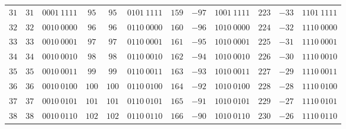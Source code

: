 \begin{center}
\begin{minipage}{0.5\linewidth}
\begin{center}
\begin{tabular}{|c|c|c||c|c|c||c|c|c||c|c|c|}
            \textcolor{numColor}{$31$} & \textcolor{twoColor}{$31$} & $0001~1111$ & \textcolor{numColor}{$95$} & \textcolor{twoColor}{$95$} & $0101~1111$ & \textcolor{numColor}{$159$} & \textcolor{twoColor}{$-97$} & $1001~1111$ & \textcolor{numColor}{$223$} & \textcolor{twoColor}{$-33$} & $1101~1111$\\ 
            \textcolor{numColor}{$32$} & \textcolor{twoColor}{$32$} & $0010~0000$ & \textcolor{numColor}{$96$} & \textcolor{twoColor}{$96$} & $0110~0000$ & \textcolor{numColor}{$160$} & \textcolor{twoColor}{$-96$} & $1010~0000$ & \textcolor{numColor}{$224$} & \textcolor{twoColor}{$-32$} & $1110~0000$\\ 
            \textcolor{numColor}{$33$} & \textcolor{twoColor}{$33$} & $0010~0001$ & \textcolor{numColor}{$97$} & \textcolor{twoColor}{$97$} & $0110~0001$ & \textcolor{numColor}{$161$} & \textcolor{twoColor}{$-95$} & $1010~0001$ & \textcolor{numColor}{$225$} & \textcolor{twoColor}{$-31$} & $1110~0001$\\ 
            \textcolor{numColor}{$34$} & \textcolor{twoColor}{$34$} & $0010~0010$ & \textcolor{numColor}{$98$} & \textcolor{twoColor}{$98$} & $0110~0010$ & \textcolor{numColor}{$162$} & \textcolor{twoColor}{$-94$} & $1010~0010$ & \textcolor{numColor}{$226$} & \textcolor{twoColor}{$-30$} & $1110~0010$\\ 
            \textcolor{numColor}{$35$} & \textcolor{twoColor}{$35$} & $0010~0011$ & \textcolor{numColor}{$99$} & \textcolor{twoColor}{$99$} & $0110~0011$ & \textcolor{numColor}{$163$} & \textcolor{twoColor}{$-93$} & $1010~0011$ & \textcolor{numColor}{$227$} & \textcolor{twoColor}{$-29$} & $1110~0011$\\ 
            \textcolor{numColor}{$36$} & \textcolor{twoColor}{$36$} & $0010~0100$ & \textcolor{numColor}{$100$} & \textcolor{twoColor}{$100$} & $0110~0100$ & \textcolor{numColor}{$164$} & \textcolor{twoColor}{$-92$} & $1010~0100$ & \textcolor{numColor}{$228$} & \textcolor{twoColor}{$-28$} & $1110~0100$\\ 
            \textcolor{numColor}{$37$} & \textcolor{twoColor}{$37$} & $0010~0101$ & \textcolor{numColor}{$101$} & \textcolor{twoColor}{$101$} & $0110~0101$ & \textcolor{numColor}{$165$} & \textcolor{twoColor}{$-91$} & $1010~0101$ & \textcolor{numColor}{$229$} & \textcolor{twoColor}{$-27$} & $1110~0101$\\ 
            \textcolor{numColor}{$38$} & \textcolor{twoColor}{$38$} & $0010~0110$ & \textcolor{numColor}{$102$} & \textcolor{twoColor}{$102$} & $0110~0110$ & \textcolor{numColor}{$166$} & \textcolor{twoColor}{$-90$} & $1010~0110$ & \textcolor{numColor}{$230$} & \textcolor{twoColor}{$-26$} & $1110~0110$\\ 

\end{tabular}
\end{center}
\end{minipage}
\end{center}
